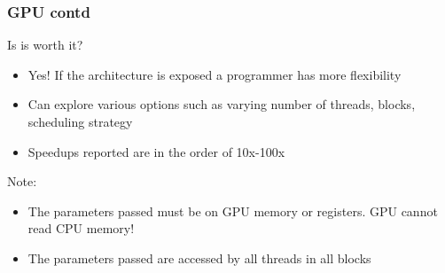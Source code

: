 \documentclass[mathserif]{beamer}
\begin{document}
\begin{frame}                                                                                                                                                                          
\frametitle{GPU contd}
Is is worth it?
\begin{itemize}
\item Yes! If the architecture is exposed a programmer has more flexibility 
\item Can explore various options such as varying number of threads, blocks, scheduling strategy 
\item Speedups reported are in the order of 10x-100x 
\end{itemize}
Note: 
\begin{itemize}
\item The parameters passed must be on GPU memory or registers. GPU cannot read CPU memory!  
\item The parameters passed are accessed by all threads in all blocks
\end{itemize} 
\end{frame}             
 
\end{document}
